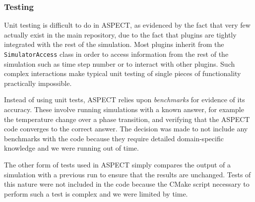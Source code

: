 \subsubsection{Testing}

Unit testing is difficult to do in ASPECT, as evidenced by the fact that very few actually exist in the main repository, due to the fact that plugins are tightly integrated with the rest of the simulation.
Most plugins inherit from the \texttt{SimulatorAccess} class in order to access information from the rest of the simulation such as time step number or to interact with other plugins.
Such complex interactions make typical unit testing of single pieces of functionality practically impossible.

Instead of using unit tests, ASPECT relies upon \textit{benchmarks} for evidence of its accuracy.
These involve running simulations with a known answer, for example the temperature change over a phase transition, and verifying that the ASPECT code converges to the correct answer.
The decision was made to not include any benchmarks with the code because they require detailed domain-specific knowledge and we were running out of time.

The other form of tests used in ASPECT simply compares the output of a simulation with a previous run to ensure that the results are unchanged.
Tests of this nature were not included in the code because the CMake script necessary to perform such a test is complex and we were limited by time.
